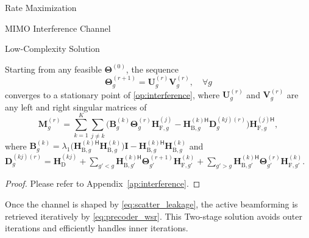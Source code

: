 \documentclass[journal]{IEEEtran}
\begin{document}
\begin{section}{Rate Maximization}
\begin{subsection}{MIMO Interference Channel}
\begin{subsubsection}{Low-Complexity Solution}
				\begin{proposition}
					\label{pp:interference}
					Starting from any feasible $\mathbf{\Theta}^{(0)}$, the sequence
					\begin{equation}
						\mathbf{\Theta}_g^{(r+1)} = \mathbf{U}_g^{(r)} \mathbf{V}_g^{(r)}, \quad \forall g
						\label{eq:scatter_leakage}
					\end{equation}
					converges to a stationary point of \eqref{op:interference}, where $\mathbf{U}_g^{(r)}$ and $\mathbf{V}_g^{(r)}$ are any left and right singular matrices of
					\begin{equation}
						\mathbf{M}_g^{(r)} = \sum_{k=1}^K \sum_{j \ne k} \bigl(\mathbf{B}_g^{(k)} \mathbf{\Theta}_g^{(r)} \mathbf{H}^{(j)}_{\mathrm{F},g} - {\mathbf{H}^{(k)\mathsf{H}}_{\mathrm{B},g}} {\mathbf{D}^{(kj)(r)}_{g}}\bigr) {\mathbf{H}^{(j)\mathsf{H}}_{\mathrm{F},g}},
					\end{equation}
					where $\mathbf{B}_g^{(k)} = \lambda_1\bigl({\mathbf{H}^{(k)\mathsf{H}}_{\mathrm{B},g}} \mathbf{H}^{(k)}_{\mathrm{B},g}\bigr) \mathbf{I} - {\mathbf{H}^{(k)\mathsf{H}}_{\mathrm{B},g}} \mathbf{H}^{(k)}_{\mathrm{B},g}$ and ${\mathbf{D}^{(kj)(r)}_{g}} = \mathbf{H}^{(kj)}_\mathrm{D} + \sum_{g'<g} {\mathbf{H}_{\mathrm{B},g'}^{(k)\mathsf{H}}} \mathbf{\Theta}_{g'}^{(r+1)} \mathbf{H}_{\mathrm{F},g'}^{(k)} + \sum_{g'>g} {\mathbf{H}_{\mathrm{B},g'}^{(k)\mathsf{H}}} \mathbf{\Theta}_{g'}^{(r)} \mathbf{H}_{\mathrm{F},g'}^{(k)}.$
				\end{proposition}
				\begin{proof}
					Please refer to Appendix~\ref{ap:interference}.
				\end{proof}
			\end{subsubsection}
			Once the channel is shaped by \eqref{eq:scatter_leakage}, the active beamforming is retrieved iteratively by \eqref{eq:precoder_wsr}.
			This Two-stage solution avoids outer iterations and efficiently handles inner iterations.
		\end{subsection}


\end{section}
\end{document}
